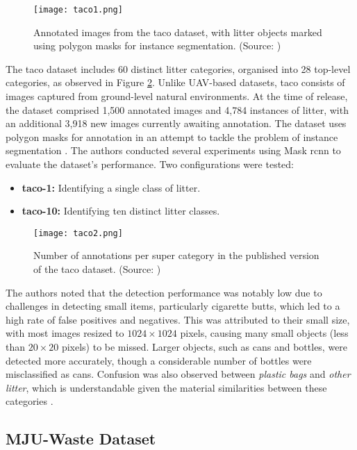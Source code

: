 \begin{figure}[!htbp]
    \centering
    \texttt{[image: taco1.png]}
    \caption{Annotated images from the \gls{taco} dataset, with litter objects marked using polygon masks for instance segmentation. (Source: \cite{taco2020})}
    \label{fig:taco1}
\end{figure}

The \gls{taco} dataset includes 60 distinct litter categories, organised into 28 top-level categories, as observed in Figure \ref{fig:taco2}. Unlike UAV-based datasets, \gls{taco} consists of images captured from ground-level natural environments. At the time of release, the dataset comprised 1,500 annotated images and 4,784 instances of litter, with an additional 3,918 new images currently awaiting annotation. The dataset uses polygon masks for annotation in an attempt to tackle the problem of instance segmentation \cite{taco2020}.
The authors conducted several experiments using Mask \gls{rcnn} to evaluate the dataset's performance. Two configurations were tested:
\begin{itemize}
    \item \textbf{\gls{taco}-1:} Identifying a single class of litter.
    \item \textbf{\gls{taco}-10:} Identifying ten distinct litter classes.
\end{itemize}

\begin{figure}[ht]
    \centering
    \texttt{[image: taco2.png]}
    \caption{Number of annotations per super category in the published version of the \gls{taco} dataset. (Source: \cite{taco2020})}
    \label{fig:taco2}
\end{figure}

The authors noted that the detection performance was notably low due to challenges in detecting small items, particularly cigarette butts, which led to a high rate of false positives and negatives. This was attributed to their small size, with most images resized to $1024 \times 1024$ pixels, causing many small objects (less than $20 \times 20$ pixels) to be missed. Larger objects, such as cans and bottles, were detected more accurately, though a considerable number of bottles were misclassified as cans. Confusion was also observed between \textit{plastic bags} and \textit{other litter}, which is understandable given the material similarities between these categories \cite{taco2020}.

\subsection{MJU-Waste Dataset}
\label{subsec:3_mju-waste}

